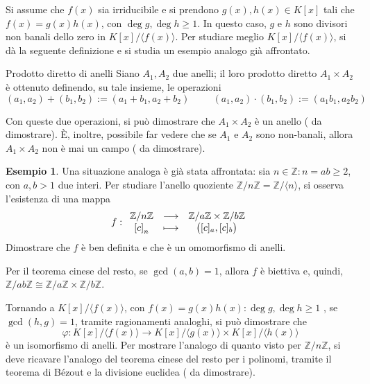 \documentclass[11pt, a4paper]{scrartcl}
\theoremstyle{definition}
\newtheorem{esempio}{Esempio}
\numberwithin{esempio}{section}
\theoremstyle{definition}
\numberwithin{obs}{section}
\numberwithin{nota}{section}
\numberwithin{equation}{subsection}
\begin{document}
Si assume che $f(x)$ sia irriducibile e si prendono $g(x), h(x) \in K[x]$ tali che $f(x) = g(x) h(x)$, con $\operatorname{deg} g, \operatorname{deg} h \ge  1$.
In questo caso, $g$ e $h$ sono divisori non banali dello zero in $K[x] / \langle f(x) \rangle$.
Per studiare meglio $K[x] / \langle f(x) \rangle$, si d\`a la seguente definizione e si studia un esempio analogo gi\`a affrontato.
\begin{definizione}
	{Prodotto diretto di anelli}{}
	Siano $A_1,A_2$ due anelli; il loro prodotto diretto $A_1 \times  A_2$ \`e ottenuto definendo, su tale insieme, le operazioni
	\[
		(a_1,a_2) + (b_1, b_2) := (a_1+ b_1, a_2+b_2) \hspace{1cm} (a_1,a_2) \cdot (b_1,b_2) := (a_1b_1, a_2b_2)
	\] 
	
\end{definizione}
\noindent Con queste due operazioni, si pu\`o dimostrare che $A_1 \times A_2 $ \`e un anello ({\color{red} da dimostrare}).
\`E, inoltre, possibile far vedere che se $A_1$ e $A_2$ sono non-banali, allora $A_1 \times A_2$ non \`e mai un campo ({\color{red} da dimostrare}).
\begin{esempio}
Una situazione analoga \`e gi\`a stata affrontata: sia $n \in \mathbb{Z} : n = ab\ge 2$, con $a,b > 1$ due interi. 
Per studiare l'anello quoziente $\mathbb{Z} / n \mathbb{Z} = \mathbb{Z}/\langle n \rangle$, si osserva l'esistenza di una mappa
\[
f: 
\begin{array}{c c c}
	\mathbb{Z} / n\mathbb{Z} & \longrightarrow & \mathbb{Z}/a \mathbb{Z} \times  \mathbb{Z} / b \mathbb{Z}\\
	\left[ c \right] _n & \longmapsto & \big([c]_a , [c]_b\big) 
\end{array}
\] 
{\color{red} Dimostrare che $f$ \`e ben definita e che \`e un omomorfismo di anelli}. 

Per il teorema cinese del resto, se $\operatorname{gcd}(a,b) =1$, allora $f$ \`e biettiva e, quindi, $\mathbb{Z} / ab \mathbb{Z} \cong \mathbb{Z} / a \mathbb{Z} \times  \mathbb{Z} / b \mathbb{Z}$.
\end{esempio}
\noindent Tornando a $K[x] / \langle f(x) \rangle$, con $f(x) = g(x) h(x) : \operatorname{deg} g ,\operatorname{deg} h	\ge 1$ , se $\operatorname{gcd}(h,g) =1$, tramite ragionamenti analoghi, si pu\`o dimostrare che
\begin{equation}
	\varphi : K[x] / \langle f(x) \rangle \longrightarrow K[x] / \langle g(x) \rangle\times K [x] / \langle h(x) \rangle
\end{equation}
\`e un isomorfismo di anelli.
Per mostrare l'analogo di quanto visto per $\mathbb{Z} / n \mathbb{Z}$, si deve ricavare l'analogo del teorema cinese del resto per i polinomi, tramite il teorema di B\'ezout e la divisione euclidea ({\color{red} da dimostrare}).
\end{document}
